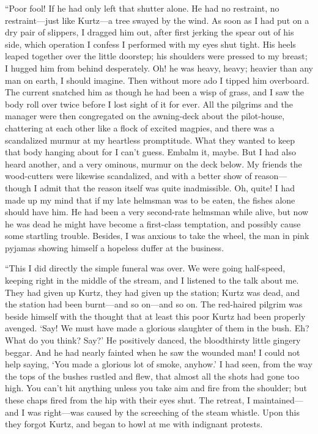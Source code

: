 \documentclass[12pt]{report}
\begin{document}
``Poor fool! If he had only left that shutter alone. He had no
restraint, no restraint---just like Kurtz---a tree swayed by the wind.
As soon as I had put on a dry pair of slippers, I dragged him out, after
first jerking the spear out of his side, which operation I confess I
performed with my eyes shut tight. His heels leaped together over the
little doorstep; his shoulders were pressed to my breast; I hugged him
from behind desperately. Oh! he was heavy, heavy; heavier than any man
on earth, I should imagine. Then without more ado I tipped him
overboard. The current snatched him as though he had been a wisp of
grass, and I saw the body roll over twice before I lost sight of it for
ever. All the pilgrims and the manager were then congregated on the
awning-deck about the pilot-house, chattering at each other like a flock
of excited magpies, and there was a scandalized murmur at my heartless
promptitude. What they wanted to keep that body hanging about for I
can't guess. Embalm it, maybe. But I had also heard another, and a very
ominous, murmur on the deck below. My friends the wood-cutters were
likewise scandalized, and with a better show of reason---though I admit
that the reason itself was quite inadmissible. Oh, quite! I had made up
my mind that if my late helmsman was to be eaten, the fishes alone
should have him. He had been a very second-rate helmsman while alive,
but now he was dead he might have become a first-class temptation, and
possibly cause some startling trouble. Besides, I was anxious to take
the wheel, the man in pink pyjamas showing himself a hopeless duffer at
the business.

``This I did directly the simple funeral was over. We were going
half-speed, keeping right in the middle of the stream, and I listened to
the talk about me. They had given up Kurtz, they had given up the
station; Kurtz was dead, and the station had been burnt---and so
on---and so on. The red-haired pilgrim was beside himself with the
thought that at least this poor Kurtz had been properly avenged. `Say!
We must have made a glorious slaughter of them in the bush. Eh? What do
you think? Say?' He positively danced, the bloodthirsty little gingery
beggar. And he had nearly fainted when he saw the wounded man! I could
not help saying, `You made a glorious lot of smoke, anyhow.' I had seen,
from the way the tops of the bushes rustled and flew, that almost all
the shots had gone too high. You can't hit anything unless you take aim
and fire from the shoulder; but these chaps fired from the hip with
their eyes shut. The retreat, I maintained---and I was right---was
caused by the screeching of the steam whistle. Upon this they forgot
Kurtz, and began to howl at me with indignant protests.
\end{document}
